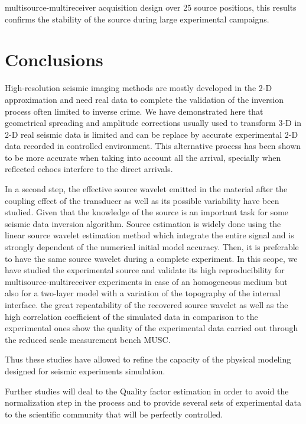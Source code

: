 \documentclass[manuscript,revised]{geophysics}
\newcommand{\twod}{2-D }
\newcommand{\thrd}{3-D }
\begin{document}
multisource-multireceiver acquisition design over 25 source positions, this results confirms the stability of the source during large experimental campaigns.     


\section{Conclusions}

\noindent High-resolution seismic imaging methods are mostly developed in the \twod approximation and need real data to complete the validation of the inversion process often limited to inverse crime. We have demonstrated here that geometrical spreading and amplitude corrections usually used to transform \thrd in \twod real seismic data is limited and can be replace by accurate experimental \twod data recorded in controlled environment. This alternative process has been shown to be more accurate when taking into account all the arrival, specially when reflected echoes interfere to the direct arrivals.

\noindent In a second step, the effective source wavelet emitted in the material after the coupling effect of the transducer as well as its possible variability have been studied. Given that the knowledge of the source is an important task for some seismic data inversion algorithm. Source estimation is widely done using the linear source wavelet estimation method which integrate the entire signal and is strongly dependent of the numerical initial model accuracy. Then, it is preferable to have the same source wavelet during a complete experiment. In this scope, we have studied the experimental source and validate its high reproducibility for multisource-multireceiver experiments in case of an homogeneous medium but also for a two-layer model with a variation of the topography of the internal interface. the great repeatability of the recovered source wavelet as well as the high correlation coefficient of the simulated data in comparison to the experimental ones show the quality of the experimental data carried out through the reduced scale measurement bench MUSC. 
 
\noindent  Thus these studies have allowed to refine the capacity of the physical modeling designed for seismic experiments simulation. 

\noindent Further studies will deal to the Quality factor estimation in order to avoid the normalization step in the process and to provide several sets of experimental data to the scientific community that will be perfectly controlled. 
\end{document}
